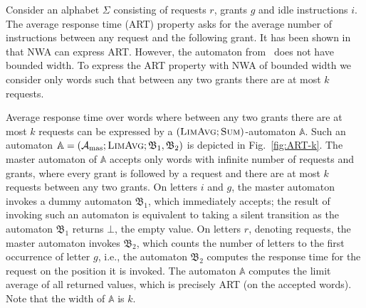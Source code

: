 \documentclass{lmcs}
\newcommand{\masterA}{\mathcal{A}_{\textrm{mas}}}
\newcommand{\nestedA}{\mathbb{A}}
\newcommand{\slaveA}{{\mathfrak{B}}}
\newcommand{\fsum}{\textsc{Sum}}
\newcommand{\flimavg}{\textsc{LimAvg}}
\begin{document}
\begin{exa}\label{ex:NWA}
Consider an alphabet $\Sigma$ consisting of requests $r$, grants $g$ and idle instructions $i$.
The average response time (ART) property asks for the average number of instructions between
any request and the following grant. It has been shown in~\cite{nested} that NWA can express ART\@.
However, the automaton from~\cite{nested} does not have bounded width.
To express the ART property with NWA of bounded width we consider only words such that between any two grants there are at most $k$ requests.

Average response time over words where between any two grants there are at most $k$ requests can be expressed by a $(\flimavg;\fsum)$-automaton
$\nestedA$. Such an automaton $\nestedA = (\masterA; \flimavg; \slaveA_1, \slaveA_2)$ is depicted in Fig.~\ref{fig:ART-k}.
The master automaton of $\nestedA$ accepts only words with  infinite number of requests and grants, where every grant is followed by a request and
there are at most $k$ requests between any two grants.
On letters $i$ and $g$, the master automaton invokes a dummy automaton $\slaveA_1$, which immediately accepts;
the result of invoking such an automaton is equivalent to taking a silent transition as
the automaton $\slaveA_1$ returns $\bot$, the empty value.
On letters $r$, denoting requests, the master automaton invokes $\slaveA_2$, which
counts the number of letters to the first occurrence of letter $g$, i.e.,
the automaton $\slaveA_2$ computes the response time for the request on the position it is invoked.
The automaton $\nestedA$ computes the limit average of all returned values, which is precisely
ART (on the accepted words).
Note that the width of $\nestedA$ is $k$.


\begin{figure}
\centering
{}
\end{figure}
\end{exa}
\end{document}
